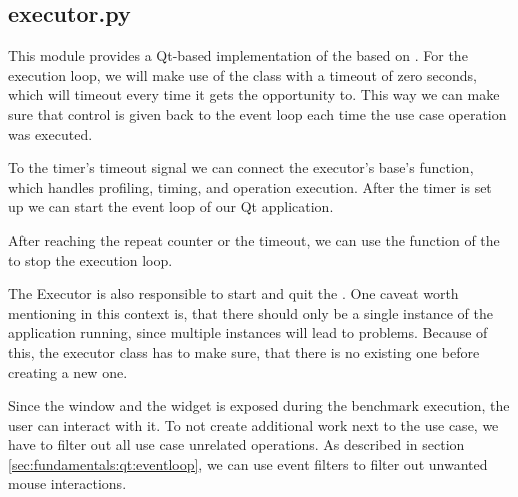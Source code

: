 \subsection{executor.py}

This module provides a Qt-based implementation of the
 based on
. For the execution loop, we will make use of
the  class with a timeout of zero seconds,
which will timeout every time it gets the opportunity to. This way we can make
sure that control is given back to the event loop each time the use case
operation was executed.
\cite{QTimer}

To the timer's timeout signal we can connect the executor's base's
 function, which handles profiling,
timing, and operation execution. After the timer is set up we can start the
event loop of our Qt application.



After reaching the repeat counter or the timeout, we can use the
 function of the 
to stop the execution loop.



The Executor is also responsible to start and quit the
. One caveat worth mentioning in this
context is, that there should only be a single instance of the application
running, since multiple  instances will lead to
problems. Because of this, the executor class has to make sure, that there is
no existing one before creating a new one.



Since the window and the widget is exposed during the benchmark execution, the
user can interact with it. To not create additional work next to the use
case, we have to filter out all use case unrelated operations. As described in
section \ref{sec:fundamentals:qt:eventloop}, we can use event filters to filter
out unwanted mouse interactions.



